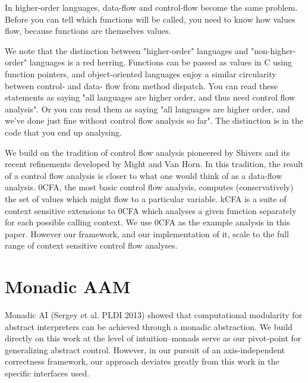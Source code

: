 \documentclass{article}
\begin{document}
In higher-order languages, data-flow and control-flow become the same problem.
Before you can tell which functions will be called, you need to know how values flow, because functions are themselves values.

We note that the distinction between "higher-order" languages and "non-higher-order" languages is a red herring.
Functions can be passed as values in C using function pointers, and object-oriented languages enjoy a similar circularity between control- and data- flow from method dispatch.
You can read these statements as saying "all languages are higher order, and thus need control flow analysis".
Or you can read them as saying "all languages are higher order, and we've done just fine without control flow analysis so far".
The distinction is in the code that you end up analysing.

We build on the tradition of control flow analysis pioneered by Shivers and its recent refinements developed by Might and Van Horn.
In this tradition, the result of a control flow analysis is closer to what one would think of as a data-flow analysis.
0CFA, the most basic control flow analysis, computes (conservatively) the set of values which might flow to a particular variable.
kCFA is a suite of context sensitive extensions to 0CFA which analyses a given function separately for each possible calling context.
We use 0CFA as the example analysis in this paper.
However our framework, and our implementation of it, scale to the full range of context sensitive control flow analyses.




\section{Monadic AAM}
\label{section:MonadicAAM}

Monadic AI (Sergey et al. PLDI 2013) showed that computational modularity for abstract interpreters can be achieved through a monadic abstraction.
We build directly on this work at the level of intuition--monads serve as our pivot-point for generalizing abstract control.
However, in our pursuit of an axis-independent correctness framework, our approach deviates greatly from this work in the specific interfaces used.
\end{document}
